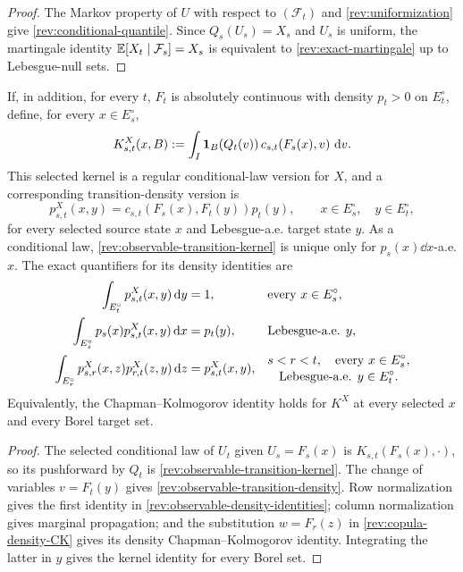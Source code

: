 \begin{proof}
The Markov property of $U$ with respect to $(\mathcal F_t)$ and
\eqref{rev:uniformization} give \eqref{rev:conditional-quantile}.  Since
$Q_s(U_s)=X_s$ and $U_s$ is uniform, the martingale identity
$\mathbb E[X_t\mid\mathcal F_s]=X_s$ is equivalent to
\eqref{rev:exact-martingale} up to Lebesgue-null sets.
\end{proof}

\begin{proposition}
\label{rev:prop-observable-density}
If, in addition, for every $t$, $F_t$ is absolutely continuous with density
$p_t>0$ on $E_t^\circ$, define, for every $x\in E_s^\circ$,
\begin{equation}
K^X_{s,t}(x,B)
:=\int_I\mathbf 1_B\!\left(Q_t(v)\right)c_{s,t}\!\left(F_s(x),v\right)\,\mathrm d v.
\label{rev:observable-transition-kernel}
\end{equation}
This selected kernel is a regular conditional-law version for $X$, and a
corresponding transition-density version is
\begin{equation}
p^X_{s,t}(x,y)
=c_{s,t}\!\left(F_s(x),F_t(y)\right)p_t(y),
\qquad x\in E_s^\circ,\quad y\in E_t^\circ,
\label{rev:observable-transition-density}
\end{equation}
for every selected source state $x$ and Lebesgue-a.e. target state $y$.
As a conditional law, \eqref{rev:observable-transition-kernel} is unique only
for $p_s(x)\dd x$-a.e. $x$.  The exact quantifiers for its density identities
are
\begin{align}
\int_{E_t^\circ}p^X_{s,t}(x,y)\,\mathrm d y&=1,
&&\text{every }x\in E_s^\circ,\notag\\
\int_{E_s^\circ}p_s(x)p^X_{s,t}(x,y)\,\mathrm d x&=p_t(y),
&&\text{Lebesgue-a.e. }y,\notag\\
\int_{E_r^\circ}p^X_{s,r}(x,z)p^X_{r,t}(z,y)\,\mathrm d z
&=p^X_{s,t}(x,y),
&&\begin{gathered}
s<r<t,\quad\text{every }x\in E_s^\circ,\\[-2pt]
\text{Lebesgue-a.e. }y\in E_t^\circ.
\end{gathered}
\label{rev:observable-density-identities}
\end{align}
Equivalently, the Chapman--Kolmogorov identity holds for
$K^X$ at every selected $x$ and every Borel target set.
\end{proposition}

\begin{proof}
The selected conditional law of $U_t$ given $U_s=F_s(x)$ is
$K_{s,t}(F_s(x),\cdot)$, so its pushforward by $Q_t$ is
\eqref{rev:observable-transition-kernel}.  The change of variables
$v=F_t(y)$ gives \eqref{rev:observable-transition-density}.  Row normalization
gives the first identity in \eqref{rev:observable-density-identities}; column
normalization gives marginal propagation; and the substitution $w=F_r(z)$ in
\eqref{rev:copula-density-CK} gives its density Chapman--Kolmogorov identity.
Integrating the latter in $y$ gives the kernel identity for every Borel set.
\end{proof}

